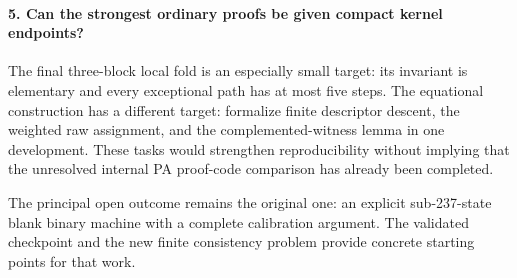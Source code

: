 \paragraph{5. Can the strongest ordinary proofs be given compact kernel endpoints?}
The final three-block local fold is an especially small target:
its invariant is elementary and every exceptional path has at
most five steps.  The equational construction has a different
target: formalize finite descriptor descent, the weighted raw
assignment, and the complemented-witness lemma in one development.
These tasks would strengthen reproducibility without implying
that the unresolved internal PA proof-code comparison has
already been completed.

The principal open outcome remains the original one: an explicit
sub-237-state blank binary machine with a complete calibration
argument.  The validated checkpoint and the new finite
consistency problem provide concrete starting points for that work.
